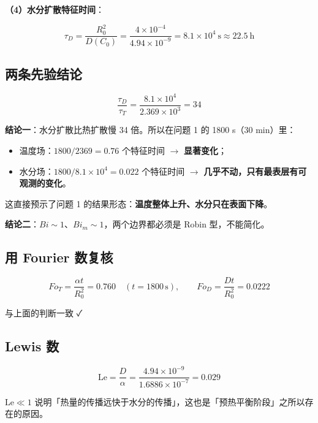 \textbf{（4）水分扩散特征时间}：


\begin{equation*}
\tau_D=\frac{R_0^2}{D(C_0)}=\frac{4\times10^{-4}}{4.94\times10^{-9}}=8.1\times10^4\ \mathrm s\approx22.5\ \mathrm h
\end{equation*}


\subsection{两条先验结论}


\begin{equation*}
\frac{\tau_D}{\tau_T}=\frac{8.1\times10^4}{2.369\times10^3}=34
\end{equation*}


\textbf{结论一}：水分扩散比热扩散慢 34 倍。所以在问题 1 的 1800 s（30 min）里：


\begin{itemize}
\item 温度场：$1800/2369=0.76$ 个特征时间 $\rightarrow$ \textbf{显著变化}；
\item 水分场：$1800/8.1\times10^4=0.022$ 个特征时间 $\rightarrow$ \textbf{几乎不动，只有最表层有可观测的变化}。
\end{itemize}


这直接预示了问题 1 的结果形态：\textbf{温度整体上升、水分只在表面下降}。


\textbf{结论二}：$Bi\sim1$、$Bi_m\sim1$，两个边界都必须是 Robin 型，不能简化。


\subsection{用 Fourier 数复核}


\begin{equation*}
Fo_T=\frac{\alpha t}{R_0^2}=0.760\quad(t=1800\,\mathrm s),\qquad
Fo_D=\frac{Dt}{R_0^2}=0.0222
\end{equation*}


与上面的判断一致 ✓


\subsection{Lewis 数}


\begin{equation*}
\mathrm{Le}=\frac{D}{\alpha}=\frac{4.94\times10^{-9}}{1.6886\times10^{-7}}=0.029
\end{equation*}


$\mathrm{Le}\ll1$ 说明「热量的传播远快于水分的传播」，这也是「预热平衡阶段」之所以存在的原因。



